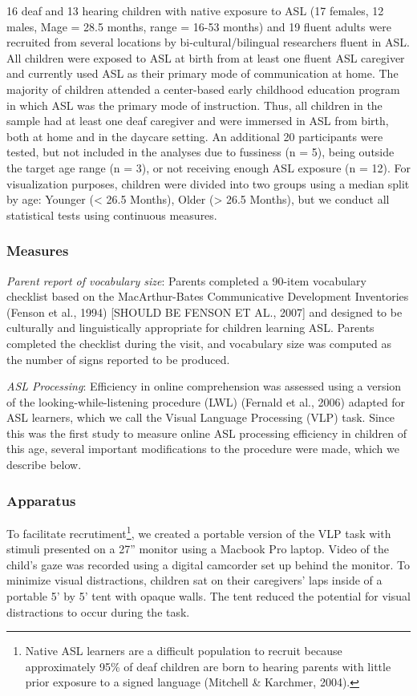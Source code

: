 \documentclass[12pt,]{article}
\let\rmarkdownfootnote\footnote%
\def\footnote{\protect\rmarkdownfootnote}
\begin{document}
16 deaf and 13 hearing children with native exposure to ASL (17 females,
12 males, Mage = 28.5 months, range = 16-53 months) and 19 fluent adults
were recruited from several locations by bi-cultural/bilingual
researchers fluent in ASL. All children were exposed to ASL at birth
from at least one fluent ASL caregiver and currently used ASL as their
primary mode of communication at home. The majority of children attended
a center-based early childhood education program in which ASL was the
primary mode of instruction. Thus, all children in the sample had at
least one deaf caregiver and were immersed in ASL from birth, both at
home and in the daycare setting. An additional 20 participants were
tested, but not included in the analyses due to fussiness (n = 5), being
outside the target age range (n = 3), or not receiving enough ASL
exposure (n = 12). For visualization purposes, children were divided
into two groups using a median split by age: Younger (\textless{} 26.5
Months), Older (\textgreater{} 26.5 Months), but we conduct all
statistical tests using continuous measures.

\subsubsection{Measures}\label{measures}

\emph{Parent report of vocabulary size}: Parents completed a 90-item
vocabulary checklist based on the MacArthur-Bates Communicative
Development Inventories (Fenson et al., 1994) {[}SHOULD BE FENSON ET
AL., 2007{]} and designed to be culturally and linguistically
appropriate for children learning ASL. Parents completed the checklist
during the visit, and vocabulary size was computed as the number of
signs reported to be produced.

\emph{ASL Processing}: Efficiency in online comprehension was assessed
using a version of the looking-while-listening procedure (LWL) (Fernald
et al., 2006) adapted for ASL learners, which we call the Visual
Language Processing (VLP) task. Since this was the first study to
measure online ASL processing efficiency in children of this age,
several important modifications to the procedure were made, which we
describe below.

\subsubsection{Apparatus}\label{apparatus}

To facilitate recrutiment\footnote{Native ASL learners are a difficult
  population to recruit because approximately 95\% of deaf children are
  born to hearing parents with little prior exposure to a signed
  language (Mitchell \& Karchmer, 2004).}, we created a portable version
of the VLP task with stimuli presented on a 27'' monitor using a Macbook
Pro laptop. Video of the child's gaze was recorded using a digital
camcorder set up behind the monitor. To minimize visual distractions,
children sat on their caregivers' laps inside of a portable 5' by 5'
tent with opaque walls. The tent reduced the potential for visual
distractions to occur during the task.
\end{document}
